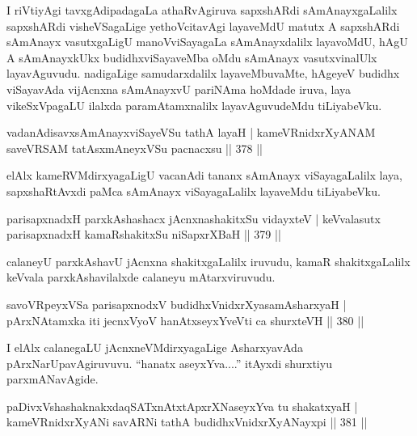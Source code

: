 \begin{artha}
I riVtiyAgi tavxgAdipadagaLa athaRvAgiruva sapxshARdi sAmAnayxgaLalilx sapxshARdi visheVSagaLige yethoVcitavAgi layaveMdU matutx A sapxshARdi sAmAnayx vasutxgaLigU manoVviSayagaLa sAmAnayxdalilx layavoMdU, hAgU A sAmAnayxkUkx budidhxviSayaveMba oMdu sAmAnayx vasutxvinalUlx layavAguvudu. nadigaLige samudarxdalilx layaveMbuvaMte, hAgeyeV budidhx viSayavAda vijAcnxna sAmAnayxvU pariNAma hoMdade iruva, laya vikeSxVpagaLU ilalxda paramAtamxnalilx layavAguvudeMdu tiLiyabeVku.
\end{artha}

\begin{shl}
vadanAdisavxsAmAnayxviSayeVSu tathA layaH |
kameVRnidxrXyANAM saveVRSAM tatAsxmAneyxVSu pacnacxsu \hfill || 378 ||
\end{shl}

\begin{artha}
elAlx kameRVMdirxyagaLigU vacanAdi tananx sAmAnayx viSayagaLalilx laya, sapxshaRtAvxdi paMca sAmAnayx viSayagaLalilx layaveMdu tiLiyabeVku.
\end{artha}


\begin{shl}
parisapxnadxH parxkAshashacx jAcnxnashakitxSu vidayxteV |
keVvalasutx parisapxnadxH kamaRshakitxSu niSapxrXBaH \hfill || 379 ||
\end{shl}

\begin{artha}
calaneyU parxkAshavU jAcnxna shakitxgaLalilx iruvudu, kamaR shakitxgaLalilx keVvala parxkAshavilalxde calaneyu mAtarxviruvudu.
\end{artha}

\begin{shl}
savoVR\s peyxVSa parisapxnodxV budidhxVnidxrXyasamAsharxyaH |
pArxNAtamxka iti jecnxVyoV hanAtxseyxYveVti ca shurxteVH \hfill || 380 ||
\end{shl}


\begin{artha}
I elAlx calanegaLU jAcnxneVMdirxyagaLige AsharxyavAda pArxNarUpavAgiruvuvu. ``hanatx aseyxYva....'' itAyxdi shurxtiyu parxmANavAgide.
\end{artha}

\begin{shl}
paDivxVshashaknakxdaqSATxnAtxtApxrXNaseyxYva tu shakatxyaH |
kameVRnidxrXyANi savARNi tathA budidhxVnidxrXyANayxpi \hfill || 381 ||
\end{shl}

